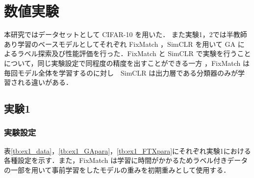 \newpage
\changeindent{0cm}
\section{数値実験}
\changeindent{2cm}

本研究ではデータセットとして CIFAR-10\cite{krizhevsky2009learning} を用いた．
また実験1，2では半教師あり学習のベースモデルとしてそれぞれ FixMatch ，SimCLR を用いて GA によるラベル探索及び性能評価を行った．FixMatch と SimCLR で実験を行うことについて，同じ実験設定で同程度の精度を出すことができる一方
，FixMatch は毎回モデル全体を学習するのに対し　SimCLR は出力層である分類器のみが学習される違いがある．

\changeindent{0cm}
\subsection{実験1}
\changeindent{2cm}

\changeindent{0cm}
\subsubsection{実験設定}
\changeindent{2cm}
表\ref{tb:ex1_data}，\ref{tb:ex1_GApara}，\ref{tb:ex1_FTXpara}にそれぞれ実験1における
各種設定を示す．また，FixMatch は学習に時間がかかるためラベル付きデータの一部を用いて事前学習をしたモデルの重みを初期重みとして使用する．

\begin{table}[h]
	\centering
	\caption{実験1 : データ内訳\label{tb:ex1_data}}
\end{table}


\begin{table}[h]
	\centering
	\caption{実験1 : GAの設定\label{tb:ex1_GApara}}
\end{table}


